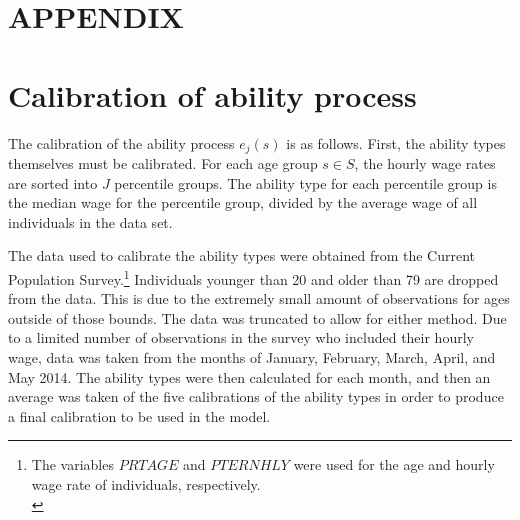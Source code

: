 \documentclass[letterpaper,12pt]{article}
\theoremstyle{definition}
\begin{document}
\begin{spacing}{1.5}


\clearpage
\end{spacing}

\newpage
\renewcommand{\theequation}{A.\arabic{section}.\arabic{equation}}
\renewcommand{\thesection}{A-\arabic{section}}   %
\setcounter{equation}{0}                         %
\setcounter{section}{0}                          %
\section*{APPENDIX}                              %

\section{Calibration of ability process}\label{AppAbilCalib}

  The calibration of the ability process $e_j(s)$ is as follows.  First, the ability types themselves must be calibrated. For each age group $s \in S$, the hourly wage rates are sorted into $J$ percentile groups.  The ability type for each percentile group is the median wage for the percentile group, divided by the average wage of all individuals in the data set.  

  The data used to calibrate the ability types were obtained from the Current Population Survey.\footnote{The variables $PRTAGE$ and $PTERNHLY$ were used for the age and hourly wage rate of individuals, respectively. \\ [-2pt]} Individuals younger than 20 and older than 79 are dropped from the data. This is due to the extremely small amount of observations for ages outside of those bounds. The data was truncated to allow for either method. Due to a limited number of observations in the survey who included their hourly wage, data was taken from the months of January, February, March, April, and May 2014.  The ability types were then calculated for each month, and then an average was taken of the five calibrations of the ability types in order to produce a final calibration to be used in the model.
\end{document}
